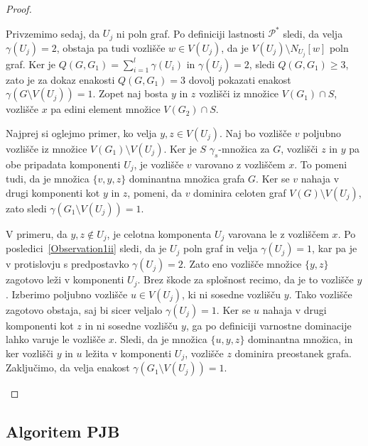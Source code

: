 \documentclass[12pt,a4paper,twoside]{article}
\theoremstyle{definition} %
\theoremstyle{plain} %
\numberwithin{equation}{section}  %
\begin{document}
\begin{proof}
\begin{itemize}
\medskip
Privzemimo sedaj, da $U_j$ ni poln graf. Po definiciji lastnosti $\mathcal{P^*}$ sledi, da velja $\gamma(U_j) = 2$, obstaja pa tudi vozlišče $w \in V(U_j)$, da je $V(U_j) \setminus N_{U_j}[w]$ poln graf. Ker je $Q(G, G_1) = \sum\limits_{i=1}^l \gamma(U_i)$ in $\gamma(U_j) = 2$, sledi $Q(G, G_1) \geq 3$, zato je za dokaz enakosti $Q(G, G_1) = 3$ dovolj pokazati enakost $\gamma(G \setminus V(U_j)) = 1$. Zopet naj bosta $y$ in $z$ vozlišči iz množice $V(G_1) \cap S$, vozlišče $x$ pa edini element množice  $V(G_2) \cap S$. 

Najprej si oglejmo primer, ko velja $y, z \in V(U_j)$. Naj bo vozlišče $v$ poljubno vozlišče iz množice $V(G_1) \setminus V(U_j)$. Ker je $S$ $\gamma_s$-množica za $G$, vozlišči $z$ in $y$ pa obe pripadata komponenti $U_j$, je vozlišče $v$ varovano z vozliščem $x$. To pomeni tudi, da je množica $\{v, y, z\}$ dominantna množica grafa $G$. Ker se $v$ nahaja v drugi komponenti kot $y$ in $z$, pomeni, da $v$ dominira celoten graf $V(G) \setminus V(U_j)$, zato sledi $\gamma(G_1 \setminus V(U_j)) = 1$.

V primeru, da $y, z \not\in U_j$, je celotna komponenta $U_j$ varovana le z vozliščem $x$. Po posledici~\ref{Observation1ii} sledi, da je $U_j$ poln graf in velja $\gamma(U_j) = 1$, kar pa je v protislovju s predpostavko $\gamma(U_j) = 2$. Zato eno vozlišče množice $\{y, z\}$ zagotovo leži v komponenti $U_j$. Brez škode za splošnost recimo, da je to vozlišče $y$. Izberimo poljubno vozlišče $u \in V(U_j)$, ki ni sosedne vozlišču $y$. Tako vozlišče zagotovo obstaja, saj bi sicer veljalo $\gamma(U_j) = 1$. Ker se $u$ nahaja v drugi komponenti kot $z$ in ni sosedne vozlišču $y$, ga po definiciji varnostne dominacije lahko varuje le vozlišče $x$. Sledi, da je množica $\{u, y, z\}$ dominantna množica, in ker vozlišči $y$ in $u$ ležita v komponenti $U_j$, vozlišče $z$ dominira preostanek grafa. Zaključimo, da velja enakost $\gamma(G_1 \setminus V(U_j)) = 1$. \qedhere
\end{itemize}
\end{proof}
 
 \subsection{Algoritem PJB}
 
\end{document}
